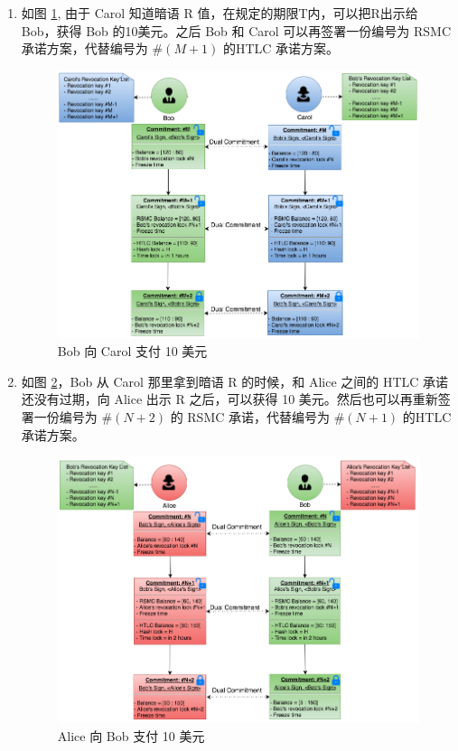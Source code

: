 \begin{enumerate}
    \item 如图 \ref{fig:htlc_bob_carol_3}, 由于 Carol 知道暗语 R 值，在规定的期限T内，可以把R出示给 Bob，获得 Bob 的10美元。之后 Bob 和 Carol 可以再签署一份编号为  RSMC 承诺方案，代替编号为 $\#(M+1)$ 的HTLC 承诺方案。

        \begin{figure}[h!]
            \centering
            \includegraphics[width=12cm, keepaspectratio]{../images/bob_carol_3.png}
            \caption{Bob 向 Carol 支付 10 美元}
            \label{fig:htlc_bob_carol_3}
        \end{figure}

    \item 如图 \ref{fig:htlc_alice_bob_3}，Bob 从 Carol 那里拿到暗语 R 的时候，和 Alice 之间的 HTLC 承诺还没有过期，向 Alice 出示 R 之后，可以获得 10 美元。然后也可以再重新签署一份编号为 $\#(N+2)$ 的 RSMC 承诺，代替编号为 $\#(N+1)$ 的HTLC 承诺方案。
        \begin{figure}[h!]
            \centering
            \includegraphics[width=12cm, keepaspectratio]{../images/alice_bob_3.png}
            \caption{Alice 向 Bob 支付 10 美元}
            \label{fig:htlc_alice_bob_3}
        \end{figure}
\end{enumerate}

